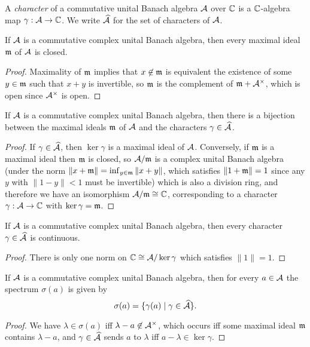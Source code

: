 \begin{defn} A \emph{character} of a commutative unital Banach algebra $\mathcal{A}$ over $\mathbb{C}$ is a $\mathbb{C}$-algebra map $\gamma : \mathcal{A} \rightarrow \mathbb{C}$. We write $\widehat{\mathcal{A}}$ for the set of characters of $\mathcal{A}$.
\end{defn}

\begin{prop} If $\mathcal{A}$ is a commutative complex unital Banach algebra, then every maximal ideal $\mathfrak{m}$ of $\mathcal{A}$ is closed.
\end{prop}
\begin{proof} Maximality of $\mathfrak{m}$ implies that $x \not\in \mathfrak{m}$ is equivalent the existence of some $y \in \mathfrak{m}$ such that $x+y$ is invertible, so $\mathfrak{m}$ is the complement of $\mathfrak{m} + \mathcal{A}^\times$, which is open since $\mathcal{A}^\times$ is open.
\end{proof}

\begin{prop} If $\mathcal{A}$ is a commutative complex unital Banach algebra, then there is a bijection between the maximal ideals $\mathfrak{m}$ of $\mathcal{A}$ and the characters $\gamma \in \widehat{\mathcal{A}}$.
\end{prop}
\begin{proof} If $\gamma \in \widehat{\mathcal{A}}$, then $\ker \gamma$ is a maximal ideal of $\mathcal{A}$. Conversely, if $\mathfrak{m}$ is a maximal ideal then $\mathfrak{m}$ is closed, so $\mathcal{A}/\mathfrak{m}$ is a complex unital Banach algebra (under the norm $\|x+\mathfrak{m}\| = \inf_{y \in \mathfrak{m}} \|x+y\|$, which satisfies $\|1+\mathfrak{m}\| = 1$ since any $y$ with $\|1-y\| < 1$ must be invertible) which is also a division ring, and therefore we have an isomorphism $\mathcal{A}/\mathfrak{m} \cong \mathbb{C}$, corresponding to a character $\gamma : \mathcal{A} \rightarrow \mathbb{C}$ with $\ker \gamma = \mathfrak{m}$.
\end{proof}

\begin{prop} If $\mathcal{A}$ is a commutative complex unital Banach algebra, then every character $\gamma \in \widehat{\mathcal{A}}$ is continuous.
\end{prop}
\begin{proof} There is only one norm on $\mathbb{C} \cong \mathcal{A}/\ker \gamma$ which satisfies $\|1\| = 1$.
\end{proof}

\begin{prop} If $\mathcal{A}$ is a commutative complex unital Banach algebra, then for every $a \in \mathcal{A}$ the spectrum $\sigma(a)$ is given by
\[
\sigma(a) = \{\gamma(a) \mid \gamma \in \widehat{\mathcal{A}}\}.
\]
\end{prop}
\begin{proof} We have $\lambda \in \sigma(a)$ iff $\lambda - a \not\in \mathcal{A}^\times$, which occurs iff some maximal ideal $\mathfrak{m}$ contains $\lambda - a$, and $\gamma \in \widehat{\mathcal{A}}$ sends $a$ to $\lambda$ iff $a-\lambda \in \ker \gamma$.
\end{proof}

